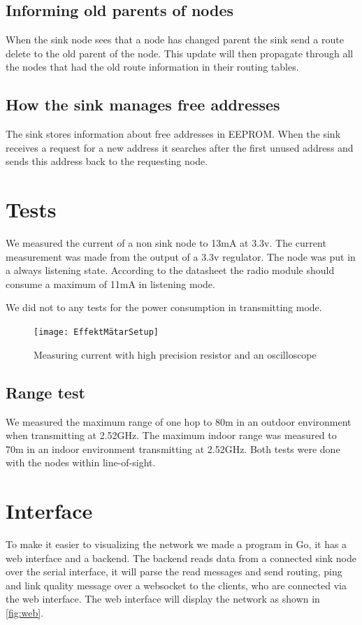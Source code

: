 \documentclass[a4paper,11pt]{article}
\begin{document}
\subsection{Informing old parents of nodes}
When the sink node sees that a node has changed parent the sink send a
route delete to the old parent of the node. This update will then
propagate through all the nodes that had the old route information in
their routing tables.

\subsection{How the sink manages free addresses}
The sink stores information about free addresses in EEPROM.  When the
sink receives a request for a new address it searches after the first
unused address and sends this address back to the requesting node.

\section{Tests}
We measured the current of a non sink node to 13mA at 3.3v. The
current measurement was made from the output of a 3.3v regulator. The
node was put in a always listening state. According to the datasheet
the radio module should consume a maximum of 11mA in listening mode.

We did not to any tests for the power consumption in transmitting
mode.

\begin{figure}[H]
  \texttt{[image: EffektMätarSetup]}
  \caption{Measuring current with high precision resistor and an oscilloscope}
  \label{fig:Effekt}
\end{figure}

\subsection{Range test}
We measured the maximum range of one hop to 80m in an outdoor
environment when transmitting at 2.52GHz. The maximum indoor range was
measured to 70m in an indoor environment transmitting at 2.52GHz. Both
tests were done with the nodes within line-of-sight.

\section{Interface}

To make it easier to visualizing the network we made a program in Go,
it has a web interface and a backend. The backend reads data from a
connected sink node over the serial interface, it will parse the read
messages and send routing, ping and link quality message over a
websocket to the clients, who are connected via the web interface. The
web interface will display the network as shown in \autoref{fig:web}.
\end{document}
